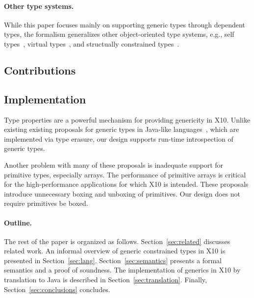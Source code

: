 \paragraph{Other type systems.}

While this paper focuses mainly on supporting generic types 
through dependent types, the formalism generalizes 
other object-oriented type systems, e.g., self
types~\cite{bruce-binary,bsg95}, virtual
types~\cite{mp89-virtual-classes,beta,ernst06-virtual},
and structually constrained
types~\cite{java-popl97,haskell-type-classes}.

\subsection{Contributions}


\subsection{Implementation}

Type properties are a powerful mechanism
for providing genericity in X10.
Unlike existing 
existing proposals for generic types in
Java-like
languages~\cite{Java3,GJ,Pizza,java-popl97,thorup97,scala},
which 
are implemented via type erasure,
our design supports run-time introspection of generic types.

Another problem with many of these proposals is inadequate support
for primitive types, especially arrays. The performance of primitive arrays is
critical for the high-performance applications for which
X10 is intended. These proposals introduce unnecessary boxing
and unboxing of primitives.
Our design does not require primitives be boxed.

\paragraph{Outline.}
The rest of the paper is organized as follows.
%
Section~\ref{sec:related} discusses related work.
%
An informal overview of generic constrained types in X10
is presented in
Section~\ref{sec:lang}.  
%
Section~\ref{sec:semantics} presents a formal semantics and a
proof of soundness.
%
The implementation of generics in X10 by translation to Java is described in 
Section~\ref{sec:translation}.
%
Finally, Section~\ref{sec:conclusions} concludes.

